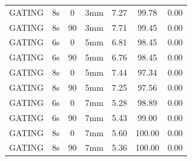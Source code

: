 \documentclass[type=dr, dr=rernat, accentcolor=tud7b,colorbacktitle, bigchapter, openright, twoside, 12pt ]{tudthesis}
\begin{document}
\begin{table}[H]
\begin{tabular}{|c||c|c|c||c|c|c|}
GATING & 8s & 0 & 3mm & 7.27 & 99.78 & 0.00 \\
GATING & 8s & 90 & 3mm & 7.71 & 99.45 & 0.00 \\
GATING & 6s & 0 & 5mm & 6.81 & 98.45 & 0.00 \\
GATING & 6s & 90 & 5mm & 6.76 & 98.45 & 0.00 \\
GATING & 8s & 0 & 5mm & 7.44 & 97.34 & 0.00 \\
GATING & 8s & 90 & 5mm & 7.25 & 97.56 & 0.00 \\
GATING & 6s & 0 & 7mm & 5.28 & 98.89 & 0.00 \\
GATING & 6s & 90 & 7mm & 5.43 & 99.00 & 0.00 \\
GATING & 8s & 0 & 7mm & 5.60 & 100.00 & 0.00 \\
GATING & 8s & 90 & 7mm & 5.36 & 100.00 & 0.00 \\
    \hline\hline 
  \end{tabular}
\end{table}

\newpage
\end{document}
